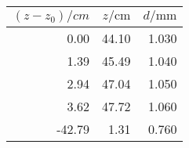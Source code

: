 \begin{tabular}{rrr}
\toprule
$(z-z_0)/\si{cm}$ & $z/\si{\cm}$ & $d/\si{\mm}$ \\
\midrule
0.00 & 44.10 & 1.030 \\
1.39 & 45.49 & 1.040 \\
2.94 & 47.04 & 1.050 \\
3.62 & 47.72 & 1.060 \\
-42.79 & 1.31 & 0.760 \\
\bottomrule
\end{tabular}
